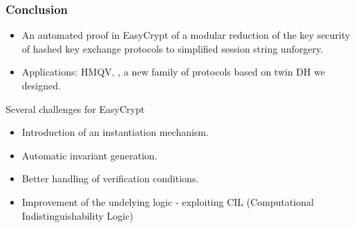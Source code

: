 \documentclass[notes,page number]{beamer}
\begin{document}
\begin{frame}
  \frametitle{Conclusion}
  \begin{itemize}
  \item An automated proof in EasyCrypt of a modular reduction of the
    key security of hashed key exchange protocols to simplified
    session string unforgery. 
  \item Applications: HMQV, \NAXOS, a new family of protocols based on
    twin DH we designed.
  \end{itemize}
  \begin{block}
    {Several challenges for EasyCrypt}
    \begin{itemize}
    \item Introduction of an instantiation mechanism.
    \item Automatic invariant generation.
    \item Better handling of verification conditions.
    \item Improvement of the undelying logic - exploiting CIL
      (Computational Indistinguishability Logic)
    \end{itemize}
  \end{block}
\end{frame}
\end{document}
